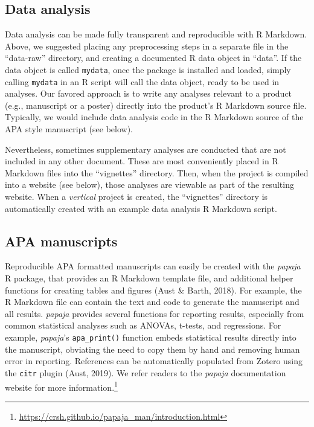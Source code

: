 \documentclass[
  english,
  jou,floatsintext]{apa6}
\begin{document}
\hypertarget{data-analysis}{%
\subsection{Data analysis}\label{data-analysis}}

Data analysis can be made fully transparent and reproducible with R Markdown. Above, we suggested placing any preprocessing steps in a separate file in the ``data-raw'' directory, and creating a documented R data object in ``data''. If the data object is called \texttt{mydata}, once the package is installed and loaded, simply calling \texttt{mydata} in an R script will call the data object, ready to be used in analyses. Our favored approach is to write any analyses relevant to a product (e.g., manuscript or a poster) directly into the product's R Markdown source file. Typically, we would include data analysis code in the R Markdown source of the APA style manuscript (see below).

Nevertheless, sometimes supplementary analyses are conducted that are not included in any other document. These are most conveniently placed in R Markdown files into the ``vignettes'' directory. Then, when the project is compiled into a website (see below), those analyses are viewable as part of the resulting website. When a \emph{vertical} project is created, the ``vignettes'' directory is automatically created with an example data analysis R Markdown script.

\hypertarget{apa-manuscripts}{%
\subsection{APA manuscripts}\label{apa-manuscripts}}

Reproducible APA formatted manuscripts can easily be created with the \emph{papaja} R package, that provides an R Markdown template file, and additional helper functions for creating tables and figures (Aust \& Barth, 2018). For example, the R Markdown file can contain the text and code to generate the manuscript and all results. \emph{papaja} provides several functions for reporting results, especially from common statistical analyses such as ANOVAs, t-tests, and regressions. For example, \emph{papaja}'s \texttt{apa\_print()} function embeds statistical results directly into the manuscript, obviating the need to copy them by hand and removing human error in reporting. References can be automatically populated from Zotero using the \texttt{citr} plugin (Aust, 2019). We refer readers to the \emph{papaja} documentation website for more information.\footnote{\url{https://crsh.github.io/papaja_man/introduction.html}}
\end{document}
